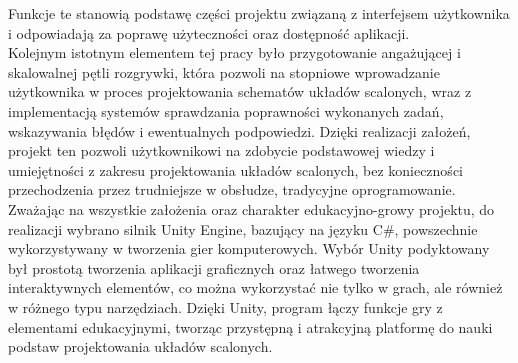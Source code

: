 Funkcje te stanowią podstawę części projektu związaną z interfejsem użytkownika
i odpowiadają za poprawę użyteczności\linebreak
oraz dostępność aplikacji.\\
\indent Kolejnym istotnym elementem tej pracy było przygotowanie angażującej\linebreak
i skalowalnej pętli rozgrywki,
która pozwoli na stopniowe wprowadzanie użytkownika w proces projektowania schematów układów scalonych,
wraz z implementacją systemów sprawdzania poprawności wykonanych zadań, wskazywania błędów i ewentualnych podpowiedzi.
Dzięki realizacji założeń, projekt ten pozwoli użytkownikowi na zdobycie podstawowej wiedzy
i umiejętności z zakresu projektowania układów scalonych,
bez konieczności przechodzenia przez trudniejsze w obsłudze, tradycyjne oprogramowanie.\\
\indent Zważając na wszystkie założenia oraz charakter edukacyjno-growy projektu,
do realizacji wybrano silnik Unity Engine,
bazujący na języku C\#,
powszechnie wykorzystywany w tworzenia gier komputerowych.
Wybór Unity podyktowany był prostotą tworzenia aplikacji graficznych oraz łatwego tworzenia interaktywnych elementów,
co można wykorzystać nie tylko w grach, ale również w różnego typu narzędziach.
Dzięki Unity,
program łączy funkcje gry z elementami edukacyjnymi,
tworząc przystępną i atrakcyjną platformę do nauki podstaw projektowania układów scalonych.
